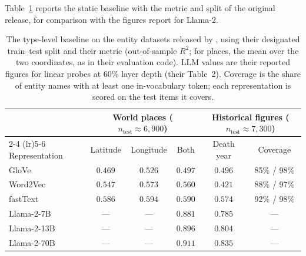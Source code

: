 \documentclass[11pt]{article}
\begin{document}
Table~\ref{tab:gt} reports the static baseline with the metric and split of the original release, for comparison with the figures \citet{gurnee2024language} report for Llama-2.

\begin{table}[!ht]
  \centering
  \caption{The type-level baseline on the entity datasets released by
  \citet{gurnee2024language}, using their designated train--test split and their
  metric (out-of-sample $R^2$; for places, the mean over the two coordinates, as in
  their evaluation code). LLM values are their reported figures for linear probes at
  60\% layer depth (their Table~2). Coverage is the share of entity names with at
  least one in-vocabulary token; each representation is scored on the test items it covers.}
  \label{tab:gt}
  \small
  \begin{tabular}{lccccc}
    \toprule
    & \multicolumn{3}{c}{World places ($n_{\text{test}} \approx 6{,}900$)} & \multicolumn{2}{c}{Historical figures ($n_{\text{test}} \approx 7{,}300$)} \\
    \cmidrule(lr){2-4} \cmidrule(lr){5-6}
    Representation & Latitude & Longitude & Both & Death year & Coverage \\
    \midrule
    GloVe            & $0.469$ & $0.526$ & $0.497$ & $0.496$ & 85\% / 98\% \\
    Word2Vec         & $0.547$ & $0.573$ & $0.560$ & $0.421$ & 88\% / 97\% \\
    fastText         & $0.586$ & $0.594$ & $0.590$ & $0.574$ & 92\% / 98\% \\
    \midrule
    Llama-2-7B       & ---     & ---     & $0.881$ & $0.785$ & --- \\
    Llama-2-13B      & ---     & ---     & $0.896$ & $0.804$ & --- \\
    Llama-2-70B      & ---     & ---     & $\mathbf{0.911}$ & $\mathbf{0.835}$ & --- \\
    \bottomrule
  \end{tabular}
\end{table}
\end{document}

